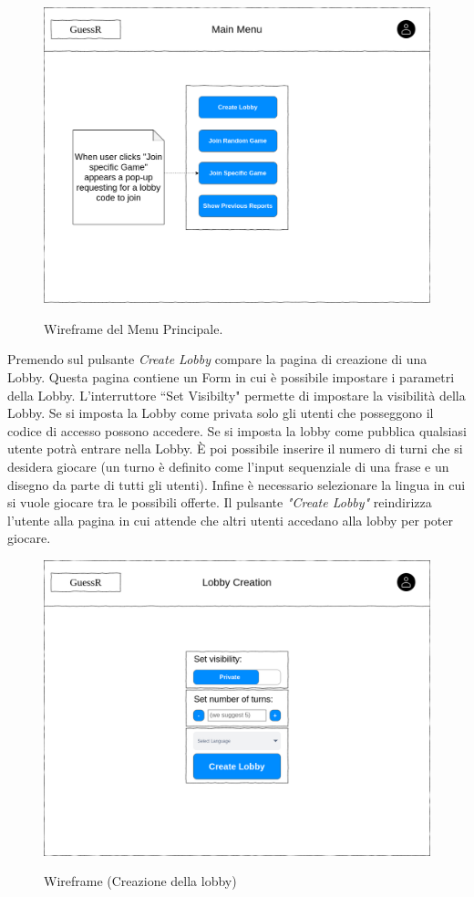 \begin{figure}[H]
    \caption{Wireframe del Menu Principale.}
    \centering
    \includegraphics[width=150mm]{img/ingSoft/wireframeMainMenu.png}
    \label{fig:main_menu_wireframe}
\end{figure}

\noindent Premendo sul pulsante \textit{Create Lobby} compare la pagina di creazione di una Lobby. Questa pagina contiene un Form in cui è possibile impostare i parametri della Lobby. L'interruttore ``Set Visibilty" permette di impostare la visibilità della Lobby. Se si imposta la Lobby come privata solo gli utenti che posseggono il codice di accesso possono accedere. Se si imposta la lobby come pubblica qualsiasi utente potrà entrare nella Lobby.
È poi possibile inserire il numero di turni che si desidera giocare (un turno è definito come l'input sequenziale di una frase e un disegno da parte di tutti gli utenti). Infine è necessario selezionare la lingua in cui si vuole giocare tra le possibili offerte. Il pulsante \textit{"Create Lobby"} reindirizza l'utente alla pagina in cui attende che altri utenti accedano alla lobby per poter giocare.
\begin{figure}[H]
    \caption{Wireframe (Creazione della lobby)}
    \centering
    \includegraphics[width=150mm]{img/ingSoft/wireframeCreation.png}
    \label{fig:lobby_create_wireframe}
\end{figure}

